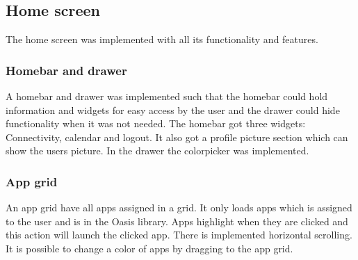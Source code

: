 \subsection{Home screen}
\label{backlog:home_screen}

The home screen was implemented with all its functionality and features.

\subsubsection{Homebar and drawer}
\label{backlog:homebar_drawer}

A homebar and drawer was implemented such that the homebar could hold information and widgets for easy access by the user and the drawer could hide functionality when it was not needed. The homebar got three widgets: Connectivity, calendar and logout. It also got a profile picture section which can show the users picture. In the drawer the colorpicker was implemented.

\subsubsection{App grid}
\label{backlog:appgrid}

An app grid have all apps assigned in a grid. It only loads \giraf[] apps which is assigned to the user and is in the Oasis library. Apps highlight when they are clicked and this action will launch the clicked app. There is implemented horizontal scrolling. It is possible to change a color of apps by dragging to the app grid.

